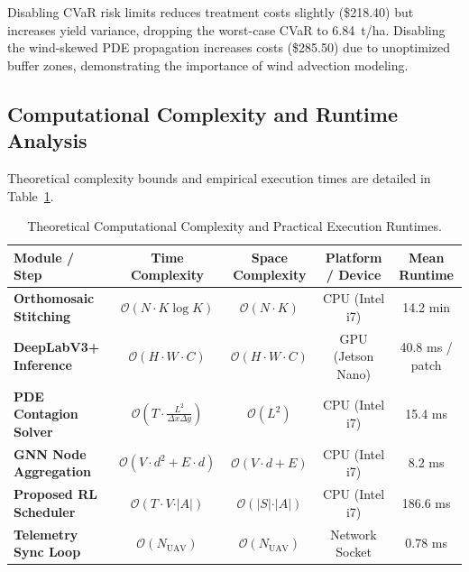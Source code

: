 \documentclass[review,3p,times,authoryear]{elsarticle}
\begin{document}
Disabling CVaR risk limits reduces treatment costs slightly (\$218.40) but increases yield variance, dropping the worst-case CVaR to 6.84~t/ha. Disabling the wind-skewed PDE propagation increases costs (\$285.50) due to unoptimized buffer zones, demonstrating the importance of wind advection modeling.

\subsection{Computational Complexity and Runtime Analysis}
Theoretical complexity bounds and empirical execution times are detailed in Table~\ref{tab:complexity}.

\begin{table}[H]
\centering
\caption{Theoretical Computational Complexity and Practical Execution Runtimes.}
\label{tab:complexity}
\begin{tabular}{lcccc}
\toprule
Module / Step & Time Complexity & Space Complexity & Platform / Device & Mean Runtime \\
\midrule
\textbf{Orthomosaic Stitching} & $\mathcal{O}(N \cdot K \log K)$ & $\mathcal{O}(N \cdot K)$ & CPU (Intel i7) & 14.2 min \\
\textbf{DeepLabV3+ Inference} & $\mathcal{O}(H \cdot W \cdot C)$ & $\mathcal{O}(H \cdot W \cdot C)$ & GPU (Jetson Nano) & 40.8 ms / patch \\
\textbf{PDE Contagion Solver} & $\mathcal{O}(T \cdot \frac{L^2}{\Delta x \Delta y})$ & $\mathcal{O}(L^2)$ & CPU (Intel i7) & 15.4 ms \\
\textbf{GNN Node Aggregation} & $\mathcal{O}(V \cdot d^2 + E \cdot d)$ & $\mathcal{O}(V \cdot d + E)$ & CPU (Intel i7) & 8.2 ms \\
\textbf{Proposed RL Scheduler} & $\mathcal{O}(T \cdot V \cdot \vert A \vert)$ & $\mathcal{O}(\vert S \vert \cdot \vert A \vert)$ & CPU (Intel i7) & 186.6 ms \\
\textbf{Telemetry Sync Loop} & $\mathcal{O}(N_\text{UAV})$ & $\mathcal{O}(N_\text{UAV})$ & Network Socket & 0.78 ms \\
\bottomrule
\end{tabular}
\end{table}
\end{document}
